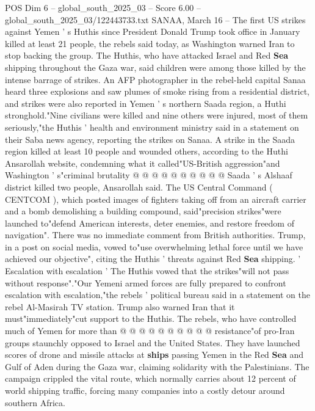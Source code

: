 \begin{textsample}{POS Dim 6 – global\_south\_2025\_03 – Score 6.00 – global\_south\_2025\_03/122443733.txt}  \label{ex:f6_pos_221}
SANAA, March 16 -- The first US strikes against Yemen ' s Huthis since President Donald Trump took office in January killed at least 21 people, the rebels said today, as Washington warned Iran to stop backing the group.
The Huthis, who have attacked Israel and Red \textbf{Sea} shipping throughout the Gaza war, said children were among those killed by the intense barrage of strikes.
An AFP photographer in the rebel-held capital Sanaa heard three explosions and saw plumes of smoke rising from a residential district, and strikes were also reported in Yemen ' s northern Saada region, a Huthi stronghold."Nine civilians were killed and nine others were injured, most of them seriously,"the Huthis ' health and environment ministry said in a statement on their Saba news agency, reporting the strikes on Sanaa.
A strike in the Saada region killed at least 10 people and wounded others, according to the Huthi Ansarollah website, condemning what it called"US-British aggression"and Washington ' s"criminal brutality @ @ @ @ @ @ @ @ @ @ Saada ' s Alshaaf district killed two people, Ansarollah said.
The US Central Command ( CENTCOM ), which posted images of fighters taking off from an aircraft carrier and a bomb demolishing a building compound, said"precision strikes"were launched to"defend American interests, deter enemies, and restore freedom of navigation".
There was no immediate comment from British authorities.
Trump, in a post on social media, vowed to"use overwhelming lethal force until we have achieved our objective", citing the Huthis ' threats against Red \textbf{Sea} shipping. ' Escalation with escalation ' The Huthis vowed that the strikes"will not pass without response"."Our Yemeni armed forces are fully prepared to confront escalation with escalation,"the rebels ' political bureau said in a statement on the rebel Al-Masirah TV station.
Trump also warned Iran that it must"immediately"cut support to the Huthis.
The rebels, who have controlled much of Yemen for more than @ @ @ @ @ @ @ @ @ @ resistance"of pro-Iran groups staunchly opposed to Israel and the United States.
They have launched scores of drone and missile attacks at \textbf{ships} passing Yemen in the Red \textbf{Sea} and Gulf of Aden during the Gaza war, claiming solidarity with the Palestinians.
The campaign crippled the vital route, which normally carries about 12 percent of world shipping traffic, forcing many companies into a costly detour around southern Africa.

\end{textsample}
